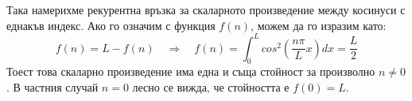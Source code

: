 \documentclass[12pt]{article}
\numberwithin{equation}{section}
\begin{document}
Така намерихме рекурентна връзка за скаларното произведение между косинуси с еднакъв индекс. Ако го означим с функция $f(n)$, можем да го изразим като:
\begin{equation}
    f(n) = L - f(n) \quad \Rightarrow \quad f(n) = \int_0^L cos^2(\frac{n\pi}{L}x) dx = \frac{L}{2}
\end{equation}
Тоест това скаларно произведение има една и съща стойност за произволно $n \neq 0$. В частния случай $n=0$ лесно се вижда, че стойността е $f(0)=L$.

\clearpage
\end{document}

